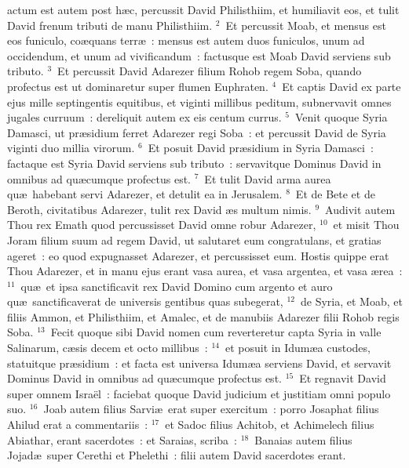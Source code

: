 \bchapter
{}actum est autem post h\ae c, percussit David Philisthiim, et humiliavit eos, et tulit David frenum tributi de manu Philisthiim.
${}^{2}$~Et percussit Moab, et mensus est eos funiculo, co\ae quans terr\ae~: mensus est autem duos funiculos, unum ad occidendum, et unum ad vivificandum~: factusque est Moab David serviens sub tributo.
${}^{3}$~Et percussit David Adarezer filium Rohob regem Soba, quando profectus est ut dominaretur super flumen Euphraten.
${}^{4}$~Et captis David ex parte ejus mille septingentis equitibus, et viginti millibus peditum, subnervavit omnes jugales curruum~: dereliquit autem ex eis centum currus.
${}^{5}$~Venit quoque Syria Damasci, ut pr\ae sidium ferret Adarezer regi Soba~: et percussit David de Syria viginti duo millia virorum.
${}^{6}$~Et posuit David pr\ae sidium in Syria Damasci~: factaque est Syria David serviens sub tributo~: servavitque Dominus David in omnibus ad qu\ae cumque profectus est.
${}^{7}$~Et tulit David arma aurea qu\ae\ habebant servi Adarezer, et detulit ea in Jerusalem.
${}^{8}$~Et de Bete et de Beroth, civitatibus Adarezer, tulit rex David \ae s multum nimis.
${}^{9}$~Audivit autem Thou rex Emath quod percussisset David omne robur Adarezer,
${}^{10}$~et misit Thou Joram filium suum ad regem David, ut salutaret eum congratulans, et gratias ageret~: eo quod expugnasset Adarezer, et percussisset eum. Hostis quippe erat Thou Adarezer, et in manu ejus erant vasa aurea, et vasa argentea, et vasa \ae rea~:
${}^{11}$~qu\ae\ et ipsa sanctificavit rex David Domino cum argento et auro qu\ae\ sanctificaverat de universis gentibus quas subegerat,
${}^{12}$~de Syria, et Moab, et filiis Ammon, et Philisthiim, et Amalec, et de manubiis Adarezer filii Rohob regis Soba.
${}^{13}$~Fecit quoque sibi David nomen cum reverteretur capta Syria in valle Salinarum, c\ae sis decem et octo millibus~:
${}^{14}$~et posuit in Idum\ae a custodes, statuitque pr\ae sidium~: et facta est universa Idum\ae a serviens David, et servavit Dominus David in omnibus ad qu\ae cumque profectus est.
${}^{15}$~Et regnavit David super omnem Isra\"el~: faciebat quoque David judicium et justitiam omni populo suo.
${}^{16}$~Joab autem filius Sarvi\ae\ erat super exercitum~: porro Josaphat filius Ahilud erat a commentariis~:
${}^{17}$~et Sadoc filius Achitob, et Achimelech filius Abiathar, erant sacerdotes~: et Saraias, scriba~:
${}^{18}$~Banaias autem filius Jojad\ae\ super Cerethi et Phelethi~: filii autem David sacerdotes erant.

